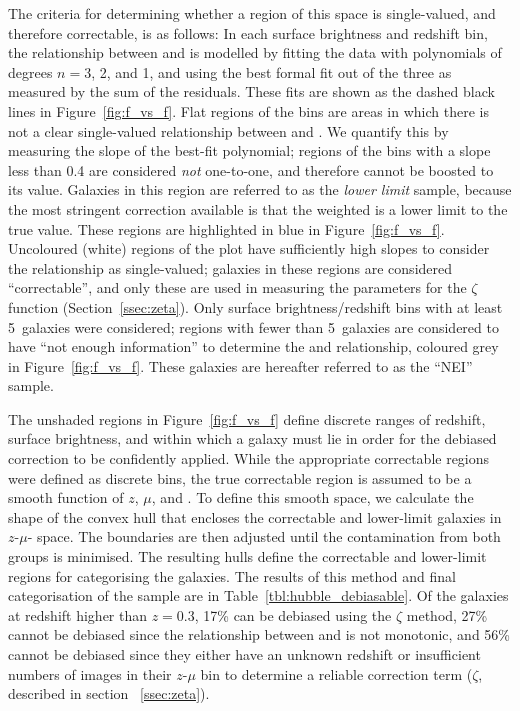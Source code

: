 \documentclass[a4paper,fleqn,usenatbib]{mnras}
\begin{document}
The criteria for determining whether a region of this space is single-valued,
and therefore correctable, is as follows: In each surface brightness and
redshift bin, the relationship between \ffeaturesz{} and \ffeaturesrest{} is
modelled by fitting the data with polynomials of degrees $n=3$, 2, and 1, and
using the best formal fit out of the three as measured by the sum of the
residuals. These fits are shown as the dashed black lines in
Figure~\ref{fig:f_vs_f}. Flat regions of the bins are areas in which there is
not a clear single-valued relationship between \ffeaturesz{} and
\ffeaturesrest. We quantify this by measuring the slope of the best-fit
polynomial; regions of the bins with a slope less than 0.4 are considered
\emph{not} one-to-one, and therefore \ffeaturesz{} cannot be boosted to its
\ffeaturesrest{} value.  Galaxies in this region are referred to as the
\emph{lower limit} sample, because the most stringent correction available is
that the weighted \ffeatures{} is a lower limit to the true value.  These
regions are highlighted in blue in Figure~\ref{fig:f_vs_f}. Uncoloured (white)
regions of the plot have sufficiently high slopes to consider the relationship
as single-valued; galaxies in these regions are considered ``correctable'', and
only these are used in measuring the parameters for the $\zeta$ function
(Section~\ref{ssec:zeta}). Only surface brightness/redshift bins with at least
5~galaxies were considered; regions with fewer than 5~galaxies are considered
to have ``not enough information'' to determine the \ffeaturesz{} and
\ffeaturesrest{} relationship, coloured grey in Figure~\ref{fig:f_vs_f}. These
galaxies are hereafter referred to as the ``NEI'' sample.

The unshaded regions in Figure~\ref{fig:f_vs_f} define discrete ranges of redshift,
surface brightness, and \ffeatures{} within which a galaxy must lie in order for the
debiased correction to be confidently applied.
While the appropriate correctable regions were defined as discrete bins, the true
correctable region is assumed to be a smooth function of $z$, $\mu$, and
\ffeatures{}. To define this smooth space, we calculate the shape of the convex
hull that encloses the correctable and lower-limit \ferengi{} galaxies in
$z$-$\mu$-\ffeatures{} space. The boundaries are then adjusted until the
contamination from both groups is minimised. The resulting hulls define the
correctable and lower-limit regions for categorising the \hst{} galaxies. The
results of this method and final categorisation of the \hst{} sample are in
Table~\ref{tbl:hubble_debiasable}. Of the galaxies at redshift higher than
$z=0.3$, 17\% can be debiased using the $\zeta$ method, 27\% cannot be debiased
since the relationship between \ffeaturesz{} and \ffeaturesrest{} is not
monotonic, and 56\% cannot be debiased since they either have an unknown
redshift or insufficient numbers of \ferengi{} images in their $z$-$\mu$ bin
to determine a reliable correction term ($\zeta$, described in section ~\ref{ssec:zeta}).
\end{document}
